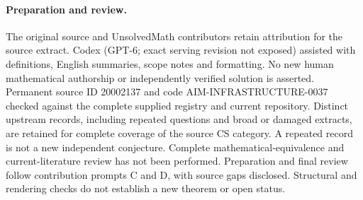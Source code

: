 \documentclass[11pt]{article}
\begin{document}
\paragraph{Preparation and review.}
The original source and UnsolvedMath contributors retain attribution for the source extract. Codex (GPT-6; exact serving revision not exposed) assisted with definitions, English summaries, scope notes and formatting. No new human mathematical authorship or independently verified solution is asserted. Permanent source ID 20002137 and code AIM-INFRASTRUCTURE-0037 checked against the complete supplied registry and current repository. Distinct upstream records, including repeated questions and broad or damaged extracts, are retained for complete coverage of the source CS category. A repeated record is not a new independent conjecture. Complete mathematical-equivalence and current-literature review has not been performed. Preparation and final review follow contribution prompts C and D, with source gaps disclosed. Structural and rendering checks do not establish a new theorem or open status.
\label{end:20002137}
\end{document}
